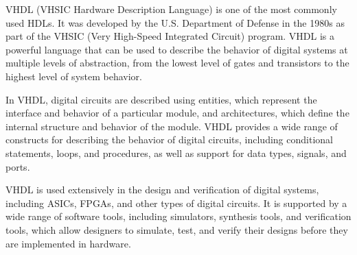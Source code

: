 VHDL (VHSIC Hardware Description Language) is one of the most commonly used HDLs. It was developed by the U.S. Department of Defense in the 1980s as part of the VHSIC (Very High-Speed Integrated Circuit) program. VHDL is a powerful language that can be used to describe the behavior of digital systems at multiple levels of abstraction, from the lowest level of gates and transistors to the highest level of system behavior.

In VHDL, digital circuits are described using entities, which represent the interface and behavior of a particular module, and architectures, which define the internal structure and behavior of the module. VHDL provides a wide range of constructs for describing the behavior of digital circuits, including conditional statements, loops, and procedures, as well as support for data types, signals, and ports.

VHDL is used extensively in the design and verification of digital systems, including ASICs, FPGAs, and other types of digital circuits. It is supported by a wide range of software tools, including simulators, synthesis tools, and verification tools, which allow designers to simulate, test, and verify their designs before they are implemented in hardware.
 